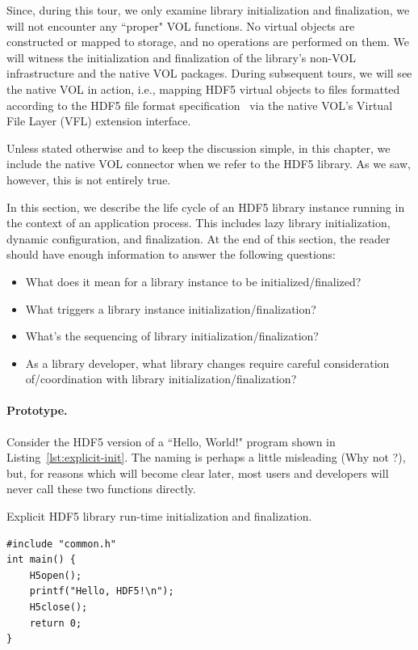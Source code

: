 Since, during this tour, we only examine library initialization and finalization, we will not encounter any ``proper" VOL functions. No virtual objects are constructed or mapped to storage, and no operations are performed on them. We will witness the initialization and finalization of the library's non-VOL infrastructure and the native VOL packages. During subsequent tours, we will see the native VOL in action, i.e., mapping HDF5 virtual objects to files formatted according to the HDF5 file format specification~\cite{ffmt} via the native VOL's Virtual File Layer (VFL) extension interface.

Unless stated otherwise and to keep the discussion simple, in this chapter, we include the native VOL connector when we refer to the HDF5 library. As we saw, however, this is not entirely true.

In this section, we describe the life cycle of an HDF5 library instance running in the context of an application process. This includes lazy library initialization, dynamic configuration, and finalization. At the end of this section, the reader should have enough information to answer the following questions:

\begin{itemize}
    \item What does it mean for a library instance to be initialized/finalized?
    \item What triggers a library instance initialization/finalization?
    \item What's the sequencing of library initialization/finalization?
    \item As a library developer, what library changes require careful consideration of/coordination with library initialization/finalization?
\end{itemize}

\paragraph{Prototype.} Consider the HDF5 version of a ``Hello, World!" program shown in Listing~\ref{lst:explicit-init}. The naming  is perhaps a little misleading (Why not ?), but, for reasons which will become clear later, most users and developers will never call these two functions directly.

\begin{listing}[H]
\caption{Explicit HDF5 library run-time initialization and finalization.}
\label{lst:explicit-init}
\begin{verbatim}
#include "common.h"
int main() {
    H5open();
    printf("Hello, HDF5!\n");
    H5close();
    return 0;
}
\end{verbatim}
\end{listing}


